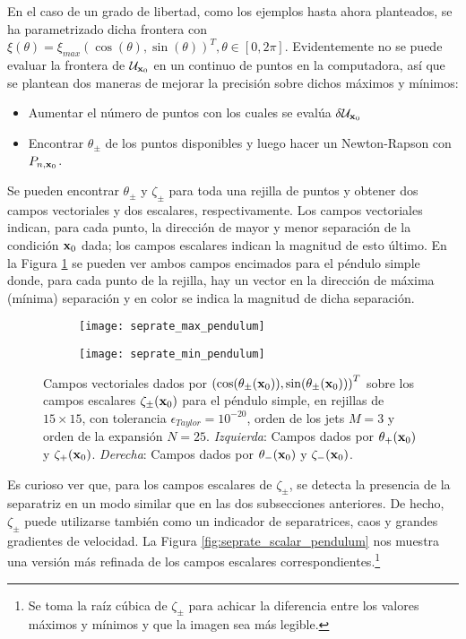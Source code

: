 En el caso de un grado de libertad, como los ejemplos hasta ahora planteados, se ha parametrizado dicha frontera con $\xi(\theta) = \xi_{max} \left( \cos(\theta), \sin(\theta) \right)^T, \theta \in [0,2\pi]$. Evidentemente no se puede evaluar la frontera de $\mathcal{U}_{\mathbf{x}_0}$ en un continuo de puntos en la computadora, así que se plantean dos maneras de mejorar la precisión sobre dichos máximos y mínimos: 
\begin{itemize}
\item Aumentar el número de puntos con los cuales se evalúa $\delta \mathcal{U}_{\mathbf{x}_0}$
\item Encontrar $\theta_{\pm}$ de los puntos disponibles y luego hacer un Newton-Rapson con $P_{n,\mathbf{x}_0}$. 
\end{itemize} 

Se pueden encontrar $\theta_\pm$ y $\zeta_\pm$ para toda una rejilla de puntos y obtener dos campos vectoriales y dos escalares, respectivamente. Los campos vectoriales indican, para cada punto, la dirección de mayor y menor separación de la condición $\mathbf{x}_0$ dada; los campos escalares indican la magnitud de esto último. En la Figura \ref{fig:seprate_pendulum} se pueden ver ambos campos encimados para el péndulo simple donde, para cada punto de la rejilla, hay un vector en la dirección de máxima (mínima) separación y en color se indica la magnitud de dicha separación.

\begin{figure}[h!]
\centering
\begin{subfigure}{0.49\textwidth}
	\centering
	\texttt{[image: seprate\_max\_pendulum]}
\end{subfigure}
%
\begin{subfigure}{0.49\textwidth}
	\centering
	\texttt{[image: seprate\_min\_pendulum]}
\end{subfigure}
\caption{ Campos vectoriales dados por $\left( \cos(\theta_\pm(\mathbf{x}_0)),\sin(\theta_\pm(\mathbf{x}_0)) \right)^T$ sobre los campos escalares $\zeta_\pm(\mathbf{x}_0)$ para el péndulo simple, en rejillas de $15\times15$, con tolerancia $\epsilon_{Taylor} = 10^{-20}$, orden de los jets $M=3$ y orden de la expansión $N=25$. \textit{Izquierda}: Campos dados por $\theta_+(\mathbf{x}_0)$ y $\zeta_+(\mathbf{x}_0)$. \textit{Derecha}: Campos dados por $\theta_-(\mathbf{x}_0)$ y $\zeta_-(\mathbf{x}_0)$.}
\label{fig:seprate_pendulum}
\end{figure}

Es curioso ver que, para los campos escalares de $\zeta_\pm$, se detecta la presencia de la separatriz en un modo similar que en las dos subsecciones anteriores. De hecho, $\zeta_\pm$ puede utilizarse también como un indicador de separatrices, caos y grandes gradientes de velocidad. La Figura \ref{fig:seprate_scalar_pendulum} nos muestra una versión más refinada de los campos escalares correspondientes.\footnote{Se toma la raíz cúbica de $\zeta_\pm$ para achicar la diferencia entre los valores máximos y mínimos y que la imagen sea más legible.} 

